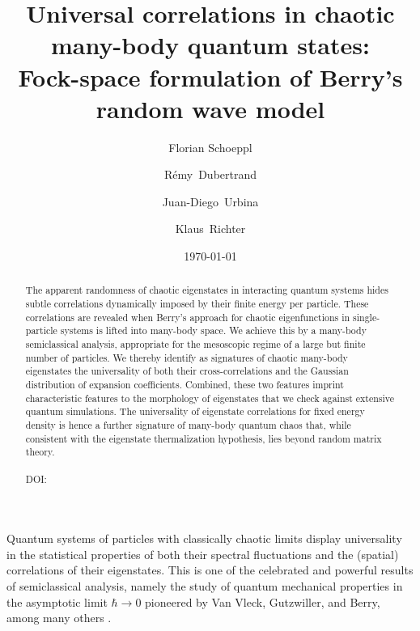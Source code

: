 \documentclass[prl,a4paper,twocolumn,superscriptaddress,floatfix]{revtex4-1}%
\begin{document}
 
\title{Universal correlations in
chaotic many-body quantum states: \\ Fock-space formulation of Berry's random wave model}

\author{Florian Schoeppl}
\author{R\'emy~Dubertrand}
\author{Juan-Diego~Urbina}
\author{Klaus~Richter}


\date{\today}%
\begin{abstract}
The apparent randomness of chaotic eigenstates in interacting quantum systems hides subtle correlations
dynamically imposed by their finite energy per particle. These correlations are revealed when Berry’s
approach for chaotic eigenfunctions in single-particle systems is lifted into many-body space. We achieve
this by a many-body semiclassical analysis, appropriate for the mesoscopic regime of a large but finite
number of particles. We thereby identify as signatures of chaotic many-body eigenstates the universality of
both their cross-correlations and the Gaussian distribution of expansion coefficients. Combined, these two
features imprint characteristic features to the morphology of eigenstates that we check against extensive
quantum simulations. The universality of eigenstate correlations for fixed energy density is hence a further
signature of many-body quantum chaos that, while consistent with the eigenstate thermalization
hypothesis, lies beyond random matrix theory.\\
\\
\noindent DOI: \hyperlink{https://journals.aps.org/prl/abstract/10.1103/PhysRevLett.134.010404}{\color{blue}{10.1103/PhysRevLett.134.010404}}
\end{abstract}

\maketitle

Quantum systems of particles with classically chaotic
limits display universality in the statistical properties of
both their spectral fluctuations and the (spatial) correlations
of their eigenstates. This is one of the celebrated and
powerful results of semiclassical analysis, namely the study
of quantum mechanical properties in the asymptotic limit $\hbar \to 0$ pioneered by Van Vleck, Gutzwiller, and Berry,
among many others \cite{Gut1,*Gut2,Berr1,BB1970,*BB1972,*BB1974,Gutb}.
\end{document}
